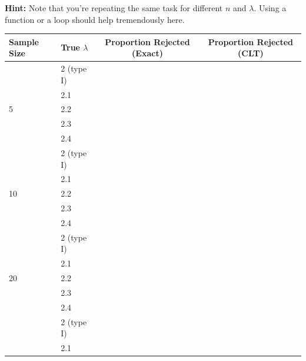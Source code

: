 \documentclass{article}\usepackage[]{graphicx}\usepackage[]{xcolor}
\begin{document}
\begin{enumerate}
\begin{enumerate}
    \textbf{Hint:} Note that you're repeating the same task for different $n$ and
    $\lambda$. Using a function or a loop should help tremendously here.
    \begin{table}[H]
      \centering
      \begin{tabular}{llcc}\hline
      Sample Size & True $\lambda$ & Proportion Rejected (Exact) & Proportion Rejected (CLT) \\\hline
        &    2 (type I)  &                              &            \\
        &    2.1         &                              &            \\
5       &    2.2         &                              &            \\
        &    2.3         &                              &            \\
        &    2.4         &                              &            \\\hline
        &    2 (type I)  &                              &            \\
        &    2.1         &                              &            \\
10      &    2.2         &                              &            \\
        &    2.3         &                              &            \\
        &    2.4         &                              &            \\\hline
        &    2 (type I)  &                              &            \\
        &    2.1         &                              &            \\
20      &    2.2         &                              &            \\
        &    2.3         &                              &            \\
        &    2.4         &                              &            \\\hline
        &    2 (type I)  &                              &            \\
        &    2.1         &                              &            \\

\end{tabular}
\end{table}
\end{enumerate}
\end{enumerate}
\end{document}
